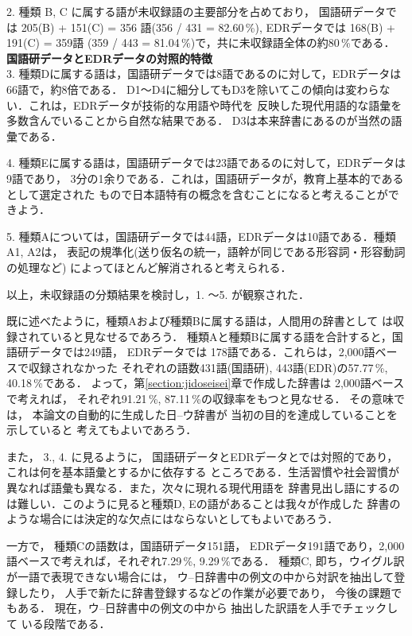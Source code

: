 {2. 種類 B, C に属する語が未収録語の主要部分を占めており， 国語研データでは
205(B) + 151(C) = 356 語(356 / 431 = 82.60\,\%), EDRデータでは 168(B) + 191(C) = 359語
(359 / 443 = 81.04\,\%)で，共に未収録語全体の約80\,\%である．\\

\noindent 
{\bf 国語研データとEDRデータの対照的特徴} \\

3. 種類Dに属する語は，国語研データでは8語であるのに対して，EDRデータは66語で，約8倍である．
D1〜D4に細分してもD3を除いてこの傾向は変わらない．これは，EDRデータが技術的な用語や時代を
反映した現代用語的な語彙を多数含んでいることから自然な結果である．
D3は本来辞書にあるのが当然の語彙である．

4. 種類Eに属する語は，国語研データでは23語であるのに対して，EDRデータは9語であり，
3分の1余りである．これは，国語研データが，教育上基本的であるとして選定された
もので日本語特有の概念を含むことになると考えることができよう．

5. 種類Aについては，国語研データでは44語，EDRデータは10語である．種類A1, A2は，
表記の規準化(送り仮名の統一，語幹が同じである形容詞・形容動詞の処理など)
によってほとんど解消されると考えられる．

以上，未収録語の分類結果を検討し，1. 〜5. が観察された．

既に述べたように，種類Aおよび種類Bに属する語は，人間用の辞書として
は収録されていると見なせるであろう．
種類Aと種類Bに属する語を合計すると，国語研データでは249語，
EDRデータでは
178語である．これらは，2,000語ベースで収録されなかった
それぞれの語数431語(国語研), 
443語(EDR)の57.77\,\%, 40.18\,\%である．
よって，第\ref{section:jidoseisei}章で作成した辞書は
2,000語ベースで考えれば，
それぞれ91.21\,\%, 87.11\,\%の収録率をもつと見なせる．
その意味では，
本論文の自動的に生成した日--ウ辞書が
当初の目的を達成していることを示していると
考えてもよいであろう．

また，
3., 4. に見るように，
国語研データとEDRデータとでは対照的であり，これは何を基本語彙とするかに依存する
ところである．生活習慣や社会習慣が異なれば語彙も異なる．また，次々に現れる現代用語を
辞書見出し語にするのは難しい．このように見ると種類D, Eの語があることは我々が作成した
辞書のような場合には決定的な欠点にはならないとしてもよいであろう．

一方で，
種類Cの語数は，国語研データ151語，
EDRデータ191語であり，2,000語ベースで考えれば，それぞれ7.29\,\%, 9.29\,\%である．
種類C, 即ち，ウイグル訳が一語で表現できない場合には，
ウ--日辞書中の例文の中から対訳を抽出して登録したり，
人手で新たに辞書登録するなどの作業が必要であり，
今後の課題でもある．
現在，ウ--日辞書中の例文の中から
抽出した訳語を人手でチェックして
いる段階である．
}
